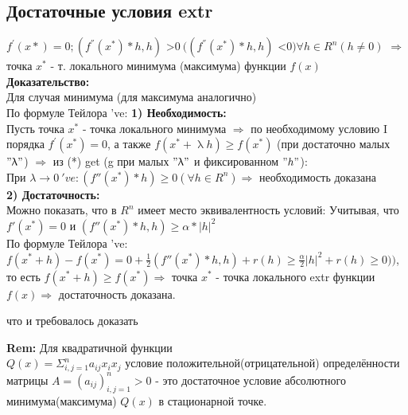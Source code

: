 \subsection*{Достаточные условия extr} $f^{'}(x*)=0; (f^{''}(x^*)*h, h)$ \textgreater $0 \ ((f^{''}(x^*)*h, h)$ \textless $0) \forall h \in R^n (h \neq 0)$ $\Rightarrow $ точка $x^*$ - т. локального минимума (максимума) функции $f(x)$\\
\textbf{Доказательство:} \\
Для случая минимума (для максимума аналогично) \\
По формуле Тейлора 've:
\textbf{1) Необходимость:} \\
Пусть точка $x^*$ - точка локального минимума $\Rightarrow$ по необходимому условию I порядка $f^{'}(x^*)=0$, а также $f(x^* + \uplambda h) \geq f(x^*)$ (при достаточно малых $"\uplambda"$) $\Rightarrow$ из (*) get (g при малых $"\uplambda"$ и фиксированном $"h"$):
\\
При $\lambda \rightarrow 0 \ 've: (f''(x^*)*h)\geq 0 (\forall h \in R^n) \Rightarrow $ необходимость доказана \\
\textbf{2) Достаточность:}\\
Можно показать, что в $R^n$ имеет место эквивалентность условий:
Учитывая, что $f'(x^*)=0$ и $(f''(x^*)*h,h)\geq \alpha * |h|^2$ \\
По формуле Тейлора 've:\\
$f(x^*+h)-f(x^*)=0+\frac{1}{2}(f''(x^*)*h,h)+r(h)\geq \frac{\alpha}{2}|h|^2+r(h) \geq 0))$, то есть $f(x^*+h) \geq f(x^*) \Rightarrow$ точка $x^*$ - точка локального extr функции $f(x) \Rightarrow$ достаточность доказана.
\begin{center}
что и требовалось доказать
\end{center}
\textbf{Rem:} 
Для квадратичной функции\\
$Q(x)=\Sigma^n_{i,j=1} a_{ij}x_i x_j$ условие положительной(отрицательной) определённости матрицы $A=(a_{ij})^n_{i,j=1}>0$ - это достаточное условие абсолютного минимума(максимума) $Q(x)$ в стационарной точке.
\newpage
